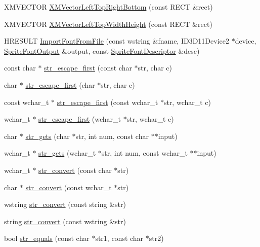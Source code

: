 \begin{DoxyCompactItemize}
X\+M\+V\+E\+C\+T\+OR \hyperlink{namespacemage_a34342faaa7525d7180807df03687aa86}{X\+M\+Vector\+Left\+Top\+Right\+Bottom} (const R\+E\+CT \&rect)
\item 
X\+M\+V\+E\+C\+T\+OR \hyperlink{namespacemage_abda051097e5b76fb65983141822cb170}{X\+M\+Vector\+Left\+Top\+Width\+Height} (const R\+E\+CT \&rect)
\item 
H\+R\+E\+S\+U\+LT \hyperlink{namespacemage_afbf05d485686caef85c42be9625540b5}{Import\+Font\+From\+File} (const wstring \&fname, I\+D3\+D11\+Device2 $\ast$device, \hyperlink{structmage_1_1_sprite_font_output}{Sprite\+Font\+Output} \&output, const \hyperlink{structmage_1_1_sprite_font_descriptor}{Sprite\+Font\+Descriptor} \&desc)
\item 
const char $\ast$ \hyperlink{namespacemage_a451f2cac5de5cebbe8bc004b3f29857b}{str\+\_\+escape\+\_\+first} (const char $\ast$str, char c)
\item 
char $\ast$ \hyperlink{namespacemage_a7a7fa3e9439ddbe1f31fe888a2a70e3d}{str\+\_\+escape\+\_\+first} (char $\ast$str, char c)
\item 
const wchar\+\_\+t $\ast$ \hyperlink{namespacemage_ac47b9d026e0ddda47b3d889beb40a2d9}{str\+\_\+escape\+\_\+first} (const wchar\+\_\+t $\ast$str, wchar\+\_\+t c)
\item 
wchar\+\_\+t $\ast$ \hyperlink{namespacemage_a8fbccb44f38a2e8b09baf805e9f34fc1}{str\+\_\+escape\+\_\+first} (wchar\+\_\+t $\ast$str, wchar\+\_\+t c)
\item 
char $\ast$ \hyperlink{namespacemage_ab7f63cc8e67ba97382747bc75fd75f62}{str\+\_\+gets} (char $\ast$str, int num, const char $\ast$$\ast$input)
\item 
wchar\+\_\+t $\ast$ \hyperlink{namespacemage_a881ab89db7712612531d47a64c6dfaa1}{str\+\_\+gets} (wchar\+\_\+t $\ast$str, int num, const wchar\+\_\+t $\ast$$\ast$input)
\item 
wchar\+\_\+t $\ast$ \hyperlink{namespacemage_af66894bb89e0f2ca0e7b9028c8039a07}{str\+\_\+convert} (const char $\ast$str)
\item 
char $\ast$ \hyperlink{namespacemage_a02da62c4ad787817700a446e56739270}{str\+\_\+convert} (const wchar\+\_\+t $\ast$str)
\item 
wstring \hyperlink{namespacemage_a7ce8ba404dec8488d86012662043d5a1}{str\+\_\+convert} (const string \&str)
\item 
string \hyperlink{namespacemage_a3a36d9cbd56787862629cb013437217b}{str\+\_\+convert} (const wstring \&str)
\item 
bool \hyperlink{namespacemage_a4f78f15f269c1f65d4148983bc8224c5}{str\+\_\+equals} (const char $\ast$str1, const char $\ast$str2)

\end{DoxyCompactItemize}

